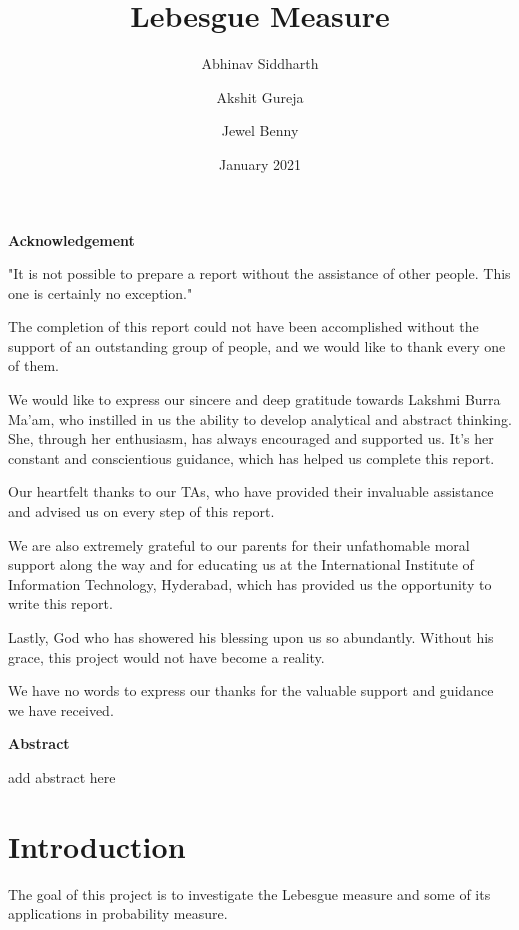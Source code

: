\documentclass{article}
\title{\textbf{Lebesgue Measure}}
\author{Abhinav Siddharth \and Akshit Gureja \and Jewel Benny}
\date{January 2021}
\begin{document}
\maketitle

\newpage
\begin{center}
    {\Large\bfseries\noindent Acknowledgement}
\end{center}

\hfill

"It is not possible to prepare a report without the assistance of other people. This one is certainly no exception."\bigskip

The completion of this report could not have been accomplished without the support of an outstanding group of people, and we would like to thank every one of them.\bigskip

We would like to express our sincere and deep gratitude towards Lakshmi Burra Ma'am, who instilled in us the ability to develop analytical and abstract thinking. She, through her enthusiasm, has always encouraged and supported us. It's her constant and conscientious guidance, which has helped us complete this report.\bigskip

Our heartfelt thanks to our TAs, who have provided their invaluable assistance and advised us on every step of this report. \bigskip

We are also extremely grateful to our parents for their unfathomable moral support along the way and for educating us at the International Institute of Information Technology, Hyderabad, which has provided us the opportunity to write this report.
\bigskip

Lastly, God who has showered his blessing upon us so abundantly. Without his grace, this project would not have become a reality.
\bigskip

We have no words to express our thanks for the valuable support and guidance we have received.

\newpage

\begin{center}
    {\Large\bfseries\noindent Abstract}
\end{center}

add abstract here
\newpage

\begin{center}
    \tableofcontents
\end{center}

\newpage

\section{Introduction}
The goal of this project is to investigate the Lebesgue measure and some of its applications in probability measure. 
\end{document}
